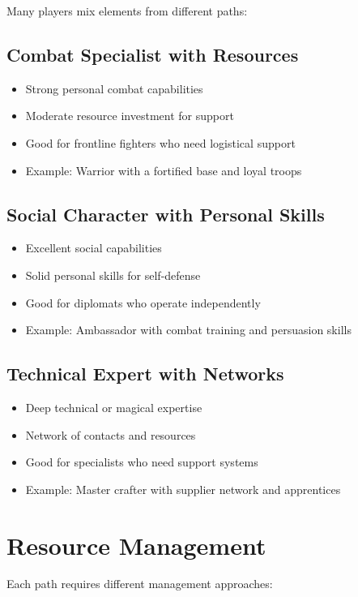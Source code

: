 \begin{multicols}{2}
Many players mix elements from different paths:

\subsection*{Combat Specialist with Resources}
\begin{itemize}
\item Strong personal combat capabilities
\item Moderate resource investment for support
\item Good for frontline fighters who need logistical support
\item Example: Warrior with a fortified base and loyal troops
\end{itemize}

\subsection*{Social Character with Personal Skills}
\begin{itemize}
\item Excellent social capabilities
\item Solid personal skills for self-defense
\item Good for diplomats who operate independently
\item Example: Ambassador with combat training and persuasion skills
\end{itemize}

\subsection*{Technical Expert with Networks}
\begin{itemize}
\item Deep technical or magical expertise
\item Network of contacts and resources
\item Good for specialists who need support systems
\item Example: Master crafter with supplier network and apprentices
\end{itemize}

\section{Resource Management}

Each path requires different management approaches:


\end{multicols}
